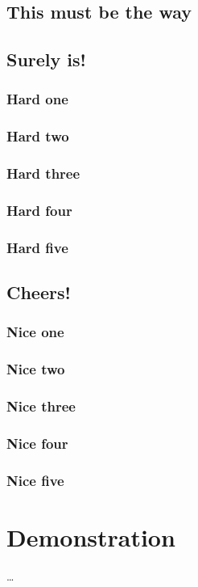\documentclass[%
        TwoSidePages,%
        English,%
        FinalVersion,%
        Copyright,%
        TablesPage,%
        FiguresPage,%
        ]%
{ic-tese-v2}
\begin{document}
\section{This must be the way}

\section{Surely is!}

\subsection{Hard one}

\subsection{Hard two}

\subsection{Hard three}

\subsection{Hard four}

\subsection{Hard five}

\section{Cheers!}

\subsection{Nice one}

\subsection{Nice two}

\subsection{Nice three}

\subsection{Nice four}

\subsection{Nice five}



\appendix
\chapter{Demonstration}
\ldots
\end{document}
